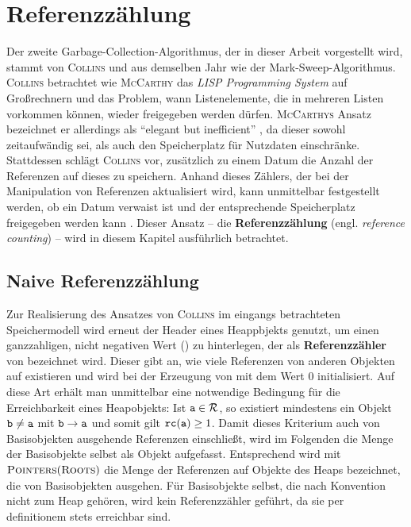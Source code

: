 \chapter{Referenzzählung}
\label{cha:reference-counting}
Der zweite Garbage-Collection-Algorithmus, der in dieser Arbeit vorgestellt wird, stammt von \textsc{Collins} und aus demselben Jahr wie der Mark-Sweep-Algorithmus.
\textsc{Collins} betrachtet wie \textsc{McCarthy} das \textit{LISP Programming System} auf Großrechnern und das Problem, wann Listenelemente, die in mehreren Listen vorkommen können, wieder freigegeben werden dürfen.
\textsc{McCarthys} Ansatz bezeichnet er allerdings als \enquote{elegant but inefficient} \cite[S. 655]{collins1960}, da dieser sowohl zeitaufwändig sei, als auch den Speicherplatz für Nutzdaten einschränke.
Stattdessen schlägt \textsc{Collins} vor, zusätzlich zu einem Datum die Anzahl der Referenzen auf dieses zu speichern.
Anhand dieses Zählers, der bei der Manipulation von Referenzen aktualisiert wird, kann unmittelbar festgestellt werden, ob ein Datum verwaist ist und der entsprechende Speicherplatz freigegeben werden kann \cite[S. 656f]{collins1960}.
Dieser Ansatz -- die \textbf{Referenzzählung} (engl. \textit{reference counting}) -- wird in diesem Kapitel ausführlich betrachtet.




\section{Naive Referenzzählung}
\label{sec:naive-rc}
Zur Realisierung des Ansatzes von \textsc{Collins} im eingangs betrachteten Speichermodell wird erneut der Header eines Heappbjekts  genutzt, um einen ganzzahligen, nicht negativen Wert () zu hinterlegen, der als \textbf{Referenzzähler} von  bezeichnet wird.
Dieser gibt an, wie viele Referenzen von anderen Objekten auf  existieren und wird bei der Erzeugung von  mit dem Wert $0$ initialisiert.
Auf diese Art erhält man unmittelbar eine notwendige Bedingung für die Erreichbarkeit eines Heapobjekts:
Ist $\texttt{a} \in \mathcal{R}$, so existiert mindestens ein Objekt $\texttt{b} \neq \texttt{a}$ mit $\texttt{b} \rightarrow \texttt{a}$ und somit gilt $\texttt{rc}(\texttt{a}) \geq 1$.
Damit dieses Kriterium auch von Basisobjekten ausgehende Referenzen einschließt, wird im Folgenden die Menge \Roots der Basisobjekte selbst als Objekt aufgefasst.
Entsprechend wird mit $\textsc{Pointers}(\textsc{Roots})$ die Menge der Referenzen auf Objekte des Heaps bezeichnet, die von Basisobjekten ausgehen.
Für Basisobjekte selbst, die nach Konvention nicht zum Heap gehören, wird kein Referenzzähler geführt, da sie per definitionem stets erreichbar sind.

